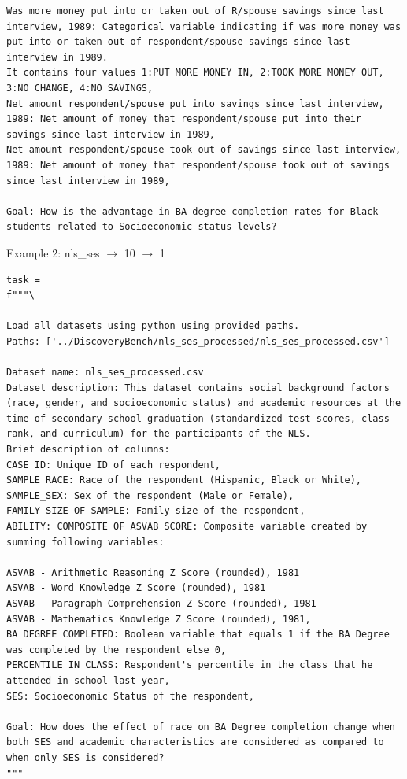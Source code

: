 \begin{verbatim}
Was more money put into or taken out of R/spouse savings since last interview, 1989: Categorical variable indicating if was more money was put into or taken out of respondent/spouse savings since last interview in 1989.
It contains four values 1:PUT MORE MONEY IN, 2:TOOK MORE MONEY OUT, 3:NO CHANGE, 4:NO SAVINGS,
Net amount respondent/spouse put into savings since last interview, 1989: Net amount of money that respondent/spouse put into their savings since last interview in 1989,
Net amount respondent/spouse took out of savings since last interview, 1989: Net amount of money that respondent/spouse took out of savings since last interview in 1989,

Goal: How is the advantage in BA degree completion rates for Black students related to Socioeconomic status levels?

        \end{verbatim}


Example 2: nls\_ses $\rightarrow$ 10 $\rightarrow$ 1

\begin{verbatim}
task =
f"""\

Load all datasets using python using provided paths.
Paths: ['../DiscoveryBench/nls_ses_processed/nls_ses_processed.csv']

Dataset name: nls_ses_processed.csv
Dataset description: This dataset contains social background factors (race, gender, and socioeconomic status) and academic resources at the time of secondary school graduation (standardized test scores, class rank, and curriculum) for the participants of the NLS.
Brief description of columns:
CASE ID: Unique ID of each respondent,
SAMPLE_RACE: Race of the respondent (Hispanic, Black or White),
SAMPLE_SEX: Sex of the respondent (Male or Female),
FAMILY SIZE OF SAMPLE: Family size of the respondent,
ABILITY: COMPOSITE OF ASVAB SCORE: Composite variable created by summing following variables:

ASVAB - Arithmetic Reasoning Z Score (rounded), 1981
ASVAB - Word Knowledge Z Score (rounded), 1981
ASVAB - Paragraph Comprehension Z Score (rounded), 1981
ASVAB - Mathematics Knowledge Z Score (rounded), 1981,
BA DEGREE COMPLETED: Boolean variable that equals 1 if the BA Degree was completed by the respondent else 0,
PERCENTILE IN CLASS: Respondent's percentile in the class that he attended in school last year,
SES: Socioeconomic Status of the respondent,

Goal: How does the effect of race on BA Degree completion change when both SES and academic characteristics are considered as compared to when only SES is considered?
"""
\end{verbatim}


